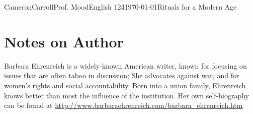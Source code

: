 \documentclass[12pt,letterpaper]{article}
\begin{document}
\begin{mla}{Cameron}{Carroll}{Prof. Mood}{English 124}{\today}{Rituals for a Modern Age}
\section*{Notes on Author}
Barbara Ehrenreich is a widely-known American writer, known for focusing on issues that are often taboo in discussion; She advocates against war, and for women's rights and social accountability. Born into a union family, Ehrenreich knows better than most the influence of the institution. Her own self-biography can be found at \url{http://www.barbaraehrenreich.com/barbara_ehrenreich.htm}
\end{mla}
\end{document}
